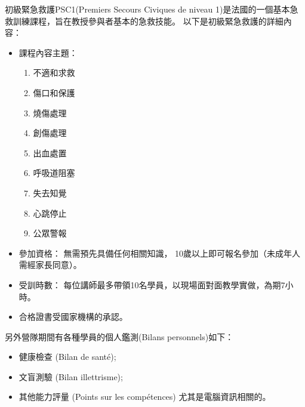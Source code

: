 \documentclass[a4paper,14pt]{extarticle}
\theoremstyle{plain}
\theoremstyle{remark}
\numberwithin{equation}{section}
\begin{document}
初級緊急救護PSC1(Premiers Secours Civiques de niveau 1)是法國的一個基本急救訓練課程，旨在教授參與者基本的急救技能。
以下是初級緊急救護的詳細內容：
\begin{itemize}
  \item 
課程內容主題：
\begin{enumerate}
  \item 不適和求救
\item 傷口和保護
\item 燒傷處理
\item 創傷處理
\item 出血處置
\item 呼吸道阻塞
\item 失去知覺
\item 心跳停止
\item 公眾警報
\end{enumerate}

%
\item 參加資格：
無需預先具備任何相關知識，
10歲以上即可報名參加（未成年人需經家長同意）。

%
%

\item 受訓時數：
  每位講師最多帶領10名學員，以現場面對面教學實做，為期7小時。

\item 合格證書受國家機構的承認。

%
%

\end{itemize}


\par
另外營隊期間有各種學員的個人鑑測(Bilans personnels)如下：
\begin{itemize}
	\item 健康檢查 (Bilan de santé);
	\item 文盲測驗 (Bilan illettrisme);
	\item 其他能力評量 (Points sur les compétences) 尤其是電腦資訊相關的。
\end{itemize}
\end{document}
